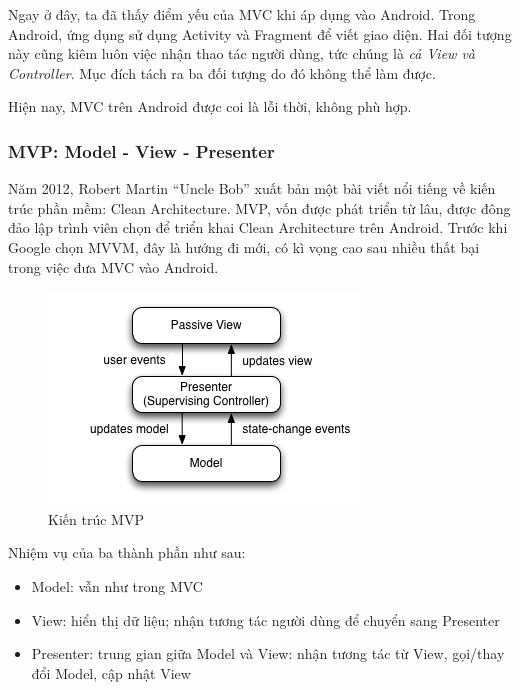 \documentclass[../../thesis]{subfiles}
\begin{document}
Ngay ở đây, ta đã thấy điểm yếu của MVC khi áp dụng vào Android. Trong Android,
ứng dụng sử dụng Activity và Fragment để viết giao diện. Hai đối tượng này cũng
kiêm luôn việc nhận thao tác người dùng, tức chúng là \emph{cả View và
Controller}. Mục đích tách ra ba đối tượng do đó không thể làm được.

Hiện nay, MVC trên Android được coi là lỗi thời, không phù hợp.

\subsubsection{MVP: Model - View - Presenter}

Năm 2012, Robert Martin ``Uncle Bob'' xuất bản một bài viết nổi tiếng về kiến
trúc phần mềm: Clean Architecture. MVP, vốn được phát triển từ lâu, được đông
đảo lập trình viên chọn để triển khai Clean Architecture trên Android. Trước khi
Google chọn MVVM, đây là hướng đi mới, có kì vọng cao sau nhiều thất bại trong
việc đưa MVC vào Android.

\begin{figure}
    \centering
    \vspace*{-3mm}
    \includegraphics[width=\linewidth]{../images/Model_View_Presenter_GUI_Design_Pattern.png}
    \vspace*{-10mm}
    \caption{Kiến trúc MVP \cite{WIKI_MVP}}
    \label{fig:mvp}
\end{figure}

Nhiệm vụ của ba thành phần như sau:

\begin{itemize}
    \item
        Model: vẫn như trong MVC
    \item
        View: hiển thị dữ liệu; nhận tương tác người dùng để chuyển sang
        Presenter
    \item
        Presenter: trung gian giữa Model và View: nhận tương tác từ View,
        gọi/thay đổi Model, cập nhật View
\end{itemize}
\end{document}
